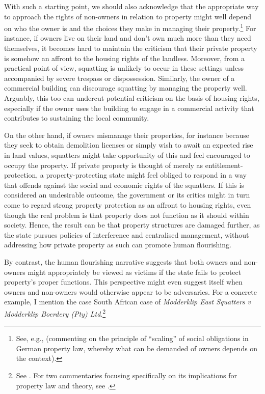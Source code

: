 With such a starting point, we should also acknowledge that the appropriate way to approach the rights of non-owners in relation to property might well depend on who the owner is and the choices they make in managing their property.\footnote{See, e.g., \cite[43]{walt11} (commenting on the principle of ``scaling'' of social obligations in German property law, whereby what can be demanded of owners depends on the context).} For instance, if owners live on their land and don't own much more than they need themselves, it becomes hard to maintain the criticism that their private property is somehow an affront to the housing rights of the landless. Moreover, from a practical point of view, squatting is unlikely to occur in these settings unless accompanied by severe trespass or dispossession. Similarly,  the owner of a commercial building can discourage squatting by managing the property well. Arguably, this too can undercut potential criticism on the basis of housing rights, especially if the owner uses the building to engage in a commercial activity that contributes to sustaining the local community.

On the other hand, if owners mismanage their properties, for instance because they seek to obtain demolition licenses or simply wish to await an expected rise in land values, squatters might take opportunity of this and feel encouraged to occupy the property. If private property is thought of merely as entitlement-protection, a property-protecting state might feel obliged to respond in a way that offends against the social and economic rights of the squatters. If this is considered an undesirable outcome, the government or its critics might in turn come to regard strong property protection as an affront to housing rights, even though the real problem is that property does not function as it should within society. Hence, the result can be that property structures are damaged further, as the state pursues policies of interference and centralised management, without addressing how private property as such can promote human flourishing.

By contrast, the human flourishing narrative suggests that both owners and non-owners might appropriately be viewed as victims if the state fails to protect property's proper functions. This perspective might even suggest itself when owners and non-owners would otherwise appear to be adversaries. For a concrete example, I mention the case South African case of {\it Modderklip East Squatters v Modderklip Boerdery (Pty) Ltd}.\footnote{See \cite{modderklip05}. For two commentaries focusing specifically on its implications for property law and theory, see \cite{alexander09d,walt05}.}


